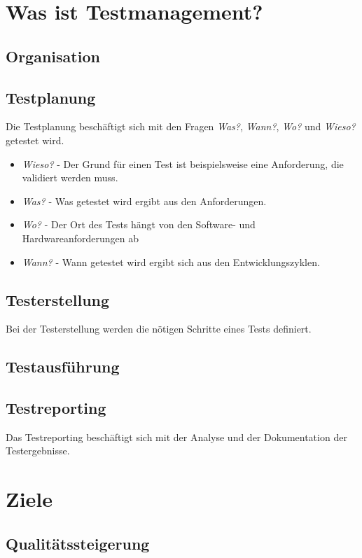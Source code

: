 \chapter{Was ist Testmanagement?}
\section{Organisation}
\section{Testplanung}
Die Testplanung besch\"aftigt sich mit den Fragen \textit{Was?}, \textit{Wann?}, \textit{Wo?} und \textit{Wieso?} getestet wird.

\begin{itemize}
	\item \textit{Wieso?} - Der Grund f\"ur einen Test ist beispielsweise eine Anforderung, die validiert werden muss.
	\item \textit{Was?} - Was getestet wird ergibt aus den Anforderungen. 
	\item \textit{Wo?} - Der Ort des Tests h\"angt von den Software- und Hardwareanforderungen ab
	\item \textit{Wann?} - Wann getestet wird ergibt sich aus den Entwicklungszyklen.
\end{itemize}


\section{Testerstellung}
Bei der Testerstellung werden die n\"otigen Schritte eines Tests definiert.  

\section{Testausf\"uhrung}

\section{Testreporting}
Das Testreporting besch\"aftigt sich mit der Analyse und der Dokumentation der Testergebnisse.

\chapter{Ziele}
\section{Qualit\"atssteigerung}
